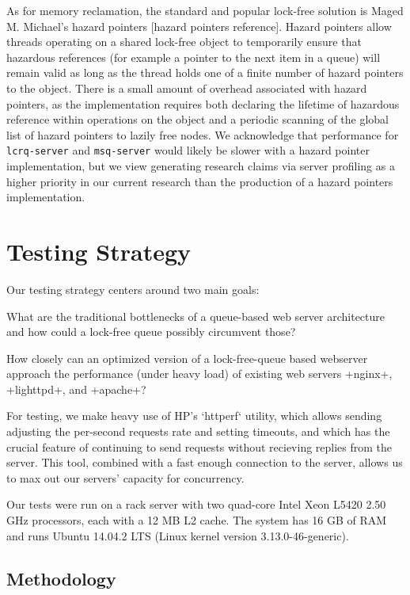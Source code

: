 \documentclass[twoside]{article}
\begin{document}
\begin{multicols}{2}
As for memory reclamation, the standard and popular lock-free solution
is Maged M. Michael's hazard pointers
[hazard pointers reference]. Hazard pointers allow threads operating
on a shared lock-free object to temporarily ensure that hazardous
references (for example a pointer to the next item in a queue) will
remain valid as long as the thread holds one of a finite number of
hazard pointers to the object. There is a small amount of overhead
associated with hazard pointers, as the implementation requires both
declaring the lifetime of hazardous reference within operations on the
object and a periodic scanning of the global list of hazard pointers
to lazily free nodes. We acknowledge that performance for
\verb+lcrq-server+ and \verb+msq-server+ would likely be slower with a hazard
pointer implementation, but we view generating research claims via
server profiling as a higher priority in our current research than the
production of a hazard pointers implementation.

\section{Testing Strategy}

Our testing strategy centers around two main goals:

\begin{compactitem}
\item What are the traditional bottlenecks of a queue-based web server
  architecture and how could a lock-free queue possibly circumvent
  those?
\item How closely can an optimized version of a lock-free-queue based
   webserver approach the performance (under heavy load) of existing
   web servers +nginx+, +lighttpd+, and +apache+?
\end{compactitem}

For testing, we make heavy use of HP's `httperf` utility, which allows
sending adjusting the per-second requests rate and setting timeouts,
and which has the crucial feature of continuing to send requests
without recieving replies from the server. This tool, combined with a
fast enough connection to the server, allows us to max out our
servers' capacity for concurrency.

Our tests were run on a rack server with two quad-core Intel Xeon
L5420 2.50 GHz processors, each with a 12 MB L2 cache. The system has
16 GB of RAM and runs Ubuntu 14.04.2 LTS (Linux kernel version
3.13.0-46-generic).

\subsection{Methodology}

\end{multicols}
\end{document}
